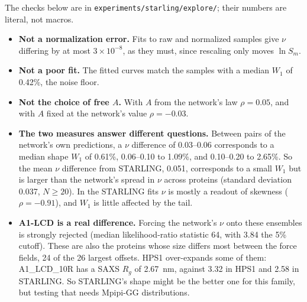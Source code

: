 \documentclass[11pt]{article}
\newcommand{\Rg}{R_g}
\begin{document}
The checks below are in \texttt{experiments/starling/explore/}; their numbers are literal, not macros.
\begin{itemize}
\item \textbf{Not a normalization error.} Fits to raw and normalized samples give $\nu$ differing by at most $3\times10^{-8}$, as they must, since rescaling only moves $\ln S_m$.
\item \textbf{Not a poor fit.} The fitted curves match the samples with a median $W_1$ of 0.42\%, the noise floor.
\item \textbf{Not the choice of free $A$.} With $A$ from the network's law $\rho=0.05$, and with $A$ fixed at the network's value $\rho=-0.03$.
\item \textbf{The two measures answer different questions.} Between pairs of the network's own predictions, a $\nu$ difference of 0.03--0.06 corresponds to a median shape $W_1$ of 0.61\%, 0.06--0.10 to 1.09\%, and 0.10--0.20 to 2.65\%. So the mean $\nu$ difference from STARLING, 0.051, corresponds to a small $W_1$
  but is larger than the network's spread in $\nu$ across proteins (standard deviation 0.037, $N\geq20$). In the STARLING fits $\nu$ is mostly a readout of skewness ($\rho=-0.91$), and $W_1$ is little affected by the tail.
\item \textbf{A1-LCD is a real difference.} Forcing the network's $\nu$ onto these ensembles is strongly rejected (median likelihood-ratio statistic 64, with 3.84 the 5\% cutoff). These are also the proteins whose size differs most between the force fields, 24 of the 26 largest offsets. HPS1 over-expands some of them: A1\_LCD\_10R has a SAXS $\Rg$ of 2.67~nm, against 3.32 in HPS1 and 2.58 in STARLING. So STARLING's shape might be the better one for this family, but testing that needs Mpipi-GG distributions.
\end{itemize}
\end{document}
